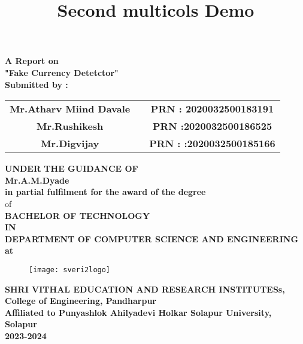 \documentclass[12pt]{article}
\title{Second multicols Demo}
\begin{document}
 \begin{center}
 \large \textbf {A Report on}\\[2mm]
 \LARGE \textbf {"Fake Currency Detetctor"}\\[7mm]
 
 \textbf{Submitted by :}\\[2mm]
 \end{center}
 
 
 \begin{tabular}{ c c c } 
 \textbf{Mr.Atharv Miind Davale} & \hspace{1.1in} & \textbf{ PRN :  2020032500183191} \\ [1mm] 
 \textbf {Mr.Rushikesh } & \hspace{1.1in} & \textbf{PRN :2020032500186525}\\[1mm]
 \textbf{ Mr.Digvijay  } & \hspace{1.1in}  & \textbf{PRN : :2020032500185166}\\[7mm]
 \end{tabular} 
 
 
 
 \begin{center}
 \large \textbf {UNDER THE GUIDANCE OF }\\[2mm]
 \large \textbf {Mr.A.M.Dyade}\\[7mm]
 \textbf {in partial fulfilment for the award of the degree} \\[2mm] of \\[2mm]
 
 \large \textbf {BACHELOR OF TECHNOLOGY}\\[2mm]
 \textbf {IN}\\[2mm]
 \textbf {DEPARTMENT OF COMPUTER SCIENCE AND ENGINEERING}\\
 \textbf {at}
 \end{center}
 
 \begin{figure}[h]
 \centering
 \texttt{[image: sveri2logo]}
\end{figure} 

\begin{center}
\textbf{SHRI VITHAL EDUCATION AND RESEARCH INSTITUTESs,\\[2mm]
College of Engineering, Pandharpur\\[3mm]
Affiliated to Punyashlok Ahilyadevi Holkar Solapur University, Solapur\\[2mm]
2023-2024}
\end{center}  
 
\end{document}
